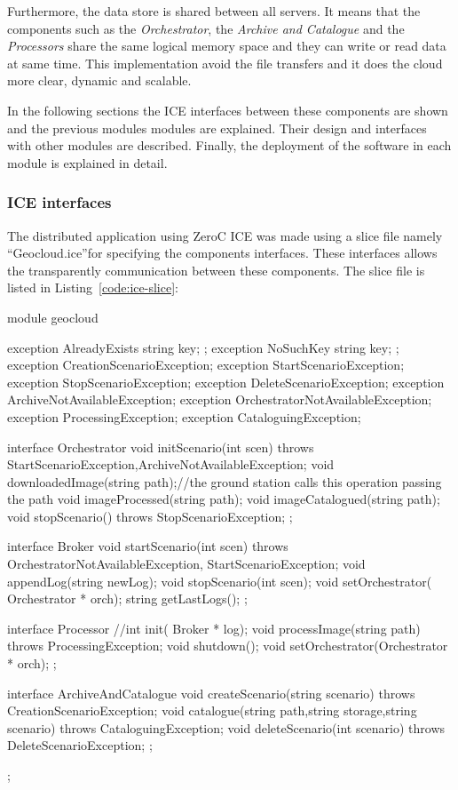 Furthermore, the data store is shared between all servers. It means that the
components such as the \emph{Orchestrator}, the \emph{Archive and Catalogue} and the
\emph{Processors} share the same logical memory space and they can write or read data
at same time. This implementation avoid the file transfers and it does the cloud
more clear, dynamic and scalable.

In the following sections the  ICE interfaces between these components are
shown and the previous modules modules are explained. Their design and
interfaces with other modules are described. Finally, the
deployment of the software in each module is explained in detail.

\subsubsection{ICE interfaces}

The distributed application using ZeroC ICE was made using a slice file namely
``Geocloud.ice''for
specifying the components interfaces. These interfaces allows the transparently
communication between these components. The slice file is listed in Listing~\ref{code:ice-slice}:


\begin{listing}[
  float=h!,
  caption  = {Slice of the ICE application},
  label    = code:ice-slice,
style=customc]

module geocloud {
    exception AlreadyExists { string key; };
    exception NoSuchKey { string key; };
    exception CreationScenarioException{};
    exception StartScenarioException{};
    exception StopScenarioException{};
    exception DeleteScenarioException{};
    exception ArchiveNotAvailableException{};
    exception OrchestratorNotAvailableException{};
    exception ProcessingException{};
    exception CataloguingException{};

    interface Orchestrator{
    	void initScenario(int scen) throws StartScenarioException,ArchiveNotAvailableException;
	void downloadedImage(string path);//the ground station calls this operation passing the path
	void imageProcessed(string path);
	void imageCatalogued(string path);
	void stopScenario() throws StopScenarioException;
    };

    interface Broker{
	void startScenario(int scen) throws OrchestratorNotAvailableException, StartScenarioException;
	void appendLog(string newLog);
	void stopScenario(int scen);
	void setOrchestrator( Orchestrator * orch);
	string getLastLogs();
    };


 interface Processor{
	//int init( Broker * log);
       	void processImage(string path) throws ProcessingException;
	void shutdown();
	void setOrchestrator(Orchestrator * orch);
    };



    interface ArchiveAndCatalogue{
	void createScenario(string scenario) throws CreationScenarioException;
	void catalogue(string path,string storage,string scenario) throws CataloguingException;
	void deleteScenario(int scenario) throws DeleteScenarioException;
    };
};
\end{listing}

